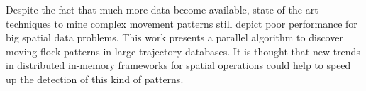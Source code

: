 \documentclass[12pt]{scrartcl}
\begin{document}
Despite the fact that much more data become available, state-of-the-art techniques to mine complex movement patterns still depict poor performance for big spatial data problems.  This work presents a parallel algorithm to discover moving flock patterns in large trajectory databases.  It is thought that new trends in distributed in-memory frameworks for spatial operations could help to speed up the detection of this kind of patterns.



\end{document}
